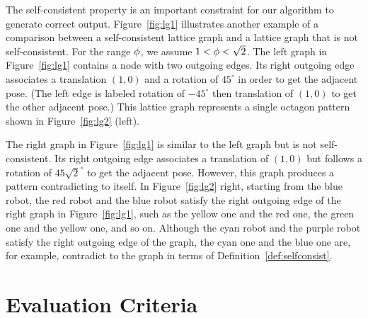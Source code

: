 
The self-consistent property is an important constraint for our algorithm to generate correct output. Figure~\ref{fig:lg1} illustrates another example of a comparison between a self-consistent lattice graph and a lattice graph that is not self-consistent. 
%
For the range $\phi$, we assume $1 < \phi < \sqrt{2}$.
The left graph in Figure~\ref{fig:lg1} contains a node with two outgoing edges. 
Its right outgoing edge associates a translation $(1,0)$ and a rotation of $45^{\circ}$ in order to get the adjacent pose.
(The left edge is labeled rotation of $-45^{\circ}$ then translation of $(1,0)$ to get the other adjacent pose.) 
This lattice graph represents a single octagon pattern shown in Figure~\ref{fig:lg2} (left).

The right graph in Figure~\ref{fig:lg1} is similar to the left graph but is not self-consistent.
Its right outgoing edge associates a translation of $(1,0)$ but follows a rotation of $45\sqrt{2}^{\circ}$ to get the adjacent pose. 
However, this graph produces a pattern contradicting to itself.
In Figure~\ref{fig:lg2} right, starting from the blue robot, the red robot and the blue robot satisfy the right outgoing edge of the right graph in Figure~\ref{fig:lg1}, such as the yellow one and the red one, the green one and the yellow one, and so on.
Although the cyan robot and the purple robot satisfy the right outgoing edge of the graph, the cyan one and the blue one are, for example, contradict to the graph in terms of Definition~\ref{def:selfconsist}.


\section{Evaluation Criteria}
\label{sec:mrf-eval}


